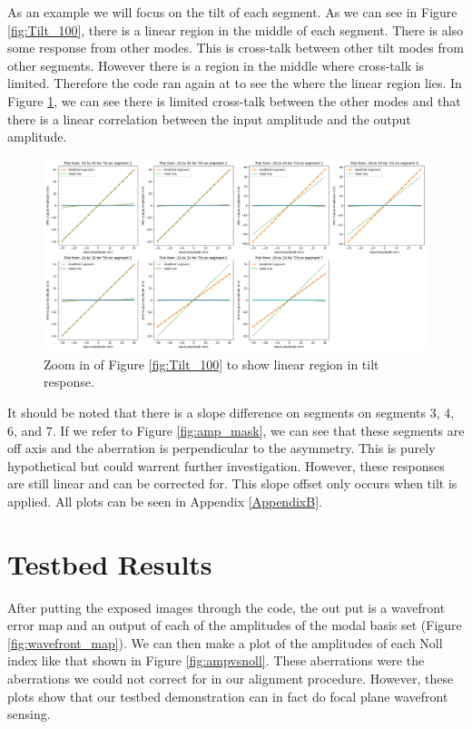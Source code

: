 As an example we will focus on the tilt of each segment.  As we can see in Figure \ref{fig:Tilt_100}, there is a linear region in the middle of each segment.  There is also some response from other modes.  This is cross-talk between other tilt modes from other segments.  However there is a region in the middle where cross-talk is limited.  Therefore the code ran again at to see the where the linear region lies.  In Figure \ref{fig:tilt30}, we can see there is limited cross-talk between the other modes and that there is a linear correlation between the input amplitude and the output amplitude.   

\begin{figure}[H]
    \centering
    \includegraphics[width = 14cm]{Figures/Tilt_response30.png}
    \caption{Zoom in of Figure \ref{fig:Tilt_100} to show linear region in tilt response.}
    \label{fig:tilt30}
\end{figure}

It should be noted that there is a slope difference on segments on segments 3, 4, 6, and 7.  If we refer to Figure \ref{fig:amp_mask}, we can see that these segments are off axis and the aberration is perpendicular to the asymmetry.  This is purely hypothetical but could warrent further investigation.  However, these responses are still linear and can be corrected for.  This slope offset only occurs when tilt is applied.  All plots can be seen in Appendix \ref{AppendixB}.

\newpage
\section{Testbed Results}
\label{sec:testbed}

After putting the exposed images through the code, the out put is a wavefront error map and an output of each of the amplitudes of the modal basis set (Figure \ref{fig:wavefront_map}).  We can then make a plot of the amplitudes of each Noll index like that shown in Figure \ref{fig:ampvsnoll}.  These aberrations were the aberrations we could not correct for in our alignment procedure.  However, these plots show that our testbed demonstration can in fact do focal plane wavefront sensing.

